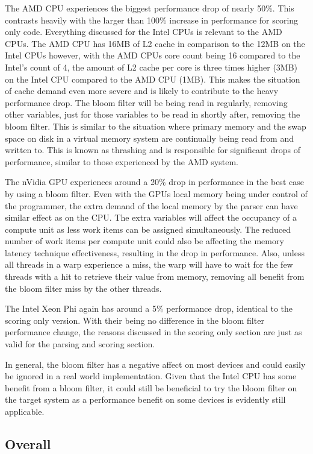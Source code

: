The AMD CPU experiences the biggest performance drop of nearly 50\%. This
contrasts heavily with the larger than 100\% increase in performance for scoring
only code. Everything discussed for the Intel CPUs is relevant to the AMD CPUs.
The AMD CPU has 16MB of L2 cache in comparison to the 12MB on the Intel CPUs
however, with the AMD CPUs core count being 16 compared to the Intel's count of
4, the amount of L2 cache per core is three times higher (3MB) on the Intel CPU
compared to the AMD CPU (1MB). This makes the situation of cache demand even
more severe and is likely to contribute to the heavy performance drop. The bloom
filter will be being read in regularly, removing other variables, just for those
variables to be read in shortly after, removing the bloom filter. This is
similar to the situation where primary memory and the swap space on disk in a
virtual memory system are continually being read from and written to. This is
known as thrashing and is responsible for significant drops of performance,
similar to those experienced by the AMD system.

The nVidia GPU experiences around a 20\% drop in performance in the best case by
using a bloom filter. Even with the GPUs local memory being under control of the
programmer, the extra demand of the local memory by the parser can have similar
effect as on the CPU. The extra variables will affect the occupancy of a compute
unit as less work items can be assigned simultaneously. The reduced number of
work items per compute unit could also be affecting the memory latency technique
effectiveness, resulting in the drop in performance. Also, unless all threads in
a warp experience a miss, the warp will have to wait for the few threads with a
hit to retrieve their value from memory, removing all benefit from the bloom
filter miss by the other threads.

The Intel Xeon Phi again has around a 5\% performance drop, identical to the
scoring only version. With their being no difference in the bloom filter
performance change, the reasons discussed in the scoring only section are just
as valid for the parsing and scoring section.

In general, the bloom filter has a negative affect on most devices and could
easily be ignored in a real world implementation. Given that the Intel CPU
has some benefit from a bloom filter, it could still be beneficial to try the
bloom filter on the target system as a performance benefit on some devices is
evidently still applicable.

\subsection{Overall}


